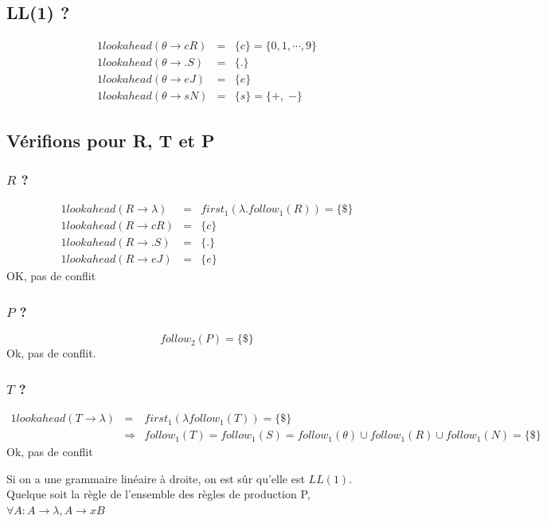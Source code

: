 \documentclass[12pt,a4paper,openany]{book}
\begin{document}
\subsection{LL(1) ?}
\begin{eqnarray*}
	1lookahead(\theta \rightarrow cR) &=& \{c\} = \{0,1,\cdots,9\}\\
	1lookahead(\theta \rightarrow .S) &=& \{.\}\\ 
	1lookahead(\theta \rightarrow eJ) &=& \{e\}\\ 
	1lookahead(\theta \rightarrow sN) &=& \{s\} = \{+,\; -\}
\end{eqnarray*}

\subsection{Vérifions pour R, T et P}
\subsubsection{$R$ ?}
\begin{eqnarray*}
	1lookahead(R \rightarrow \lambda) &=& first_1(\lambda.follow_1(R)) = \{\$\}\\ 
	1lookahead(R \rightarrow cR) &=& \{c\}\\
	1lookahead(R \rightarrow .S) &=& \{.\}\\
	1lookahead(R \rightarrow eJ) &=& \{e\}
\end{eqnarray*}
OK, pas de conflit

\subsubsection{$P$ ?}
$$follow_2(P) = \{\$\}$$
Ok, pas de conflit.

\subsubsection{$T$ ?}
\begin{eqnarray*}
	1lookahead(T \rightarrow \lambda) &=& first_1(\lambda follow_1(T)) = \{\$\}\\
	&\Rightarrow& follow_1(T) = follow_1(S) = follow_1(\theta) \cup follow_1(R) \cup follow_1(N) = \{\$\}
\end{eqnarray*}
Ok, pas de conflit

\begin{remarque}
	Si on a une grammaire linéaire à droite, on est sûr qu'elle est $LL(1)$.\\
	
	Quelque soit la règle de l'ensemble des règles de production P, $\forall A : A \rightarrow \lambda, A \rightarrow xB$
\end{remarque}
\end{document}
